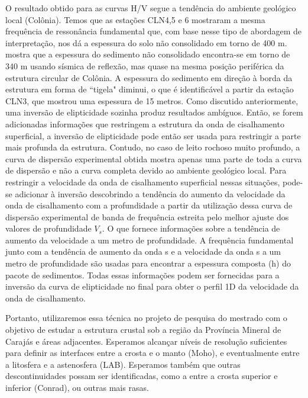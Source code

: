 \documentclass[smallextended]{svjour3}       %
\begin{document}
O resultado obtido para as curvas H/V segue a tendência do ambiente geológico local (Colônia). Temos que as estações CLN4,5 e 6 mostraram a mesma frequência de ressonância fundamental que, com base nesse tipo de abordagem de interpretação, nos dá a espessura do solo não consolidado em torno de 400 m. \cite{riccomini2011colonia} mostra que a espessura do sedimento não consolidado encontra-se em torno de 340 m usando sísmica de reflexão, mas quase na mesma posição periférica da estrutura circular de Colônia. A espessura do sedimento em direção à borda da estrutura em forma de ``tigela" diminui, o que é identificável a partir da estação CLN3, que mostrou uma espessura de 15 metros. Como discutido anteriormente, uma inversão de elipticidade sozinha produz resultados ambíguos. Então, se forem adicionadas informações que restringem a estrutura da onda de cisalhamento superficial, a inversão de elipticidade pode então ser usada para restringir a parte mais profunda da estrutura. Contudo, no caso de leito rochoso muito profundo, a curva de dispersão experimental obtida mostra apenas uma parte de toda a curva de dispersão e não a curva completa devido ao ambiente geológico local. Para restringir a velocidade da onda de cisalhamento superficial nessas situações, pode-se adicionar à inversão descobrindo a tendência do aumento da velocidade da onda de cisalhamento com a profundidade a partir da utilização dessa curva de dispersão experimental de banda de frequência estreita pelo melhor ajuste dos valores de profundidade $V_s$. O que fornece informações sobre a tendência de aumento da velocidade a um metro de profundidade. A frequência fundamental junto com a tendência de aumento da onda s e a velocidade da onda s a um metro de profundidade são usadas para encontrar a espessura composta (h) do pacote de sedimentos. Todas essas informações podem ser fornecidas para a inversão da curva de elipticidade no final para obter o perfil 1D da velocidade da onda de cisalhamento.

Portanto, utilizaremos essa técnica no projeto de pesquisa do mestrado com o objetivo de estudar a estrutura crustal sob a região da Província Mineral de Carajás e áreas adjacentes. Esperamos alcançar níveis de resolução suficientes para definir as interfaces entre a crosta e o manto (Moho), e eventualmente entre a litosfera e a astenosfera (LAB). Esperamos também que outras descontinuidades possam ser identificadas, como a entre a crosta superior e inferior (Conrad), ou outras mais rasas. 

\newpage





\end{document}
